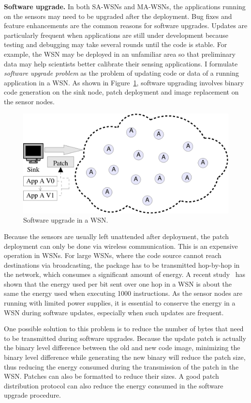 \textbf{Software upgrade.}
In both SA-WSNs and MA-WSNs, the applications running on the sensors may need to be upgraded after the deployment.
Bug fixes and feature enhancements are the common reasons for software upgrades.
Updates are particularly frequent when applications are still under development because testing and debugging may take several rounds until the code is stable.
For example, the WSN may be deployed in an unfamiliar area so that preliminary data may help scientists better calibrate their sensing applications. I formulate {\em software upgrade problem} as the problem of updating code or data of a running application in a WSN. As shown in Figure~\ref{fig:upgrade}, software upgrading involves binary code generation on the sink node, patch deployment and image replacement on the sensor nodes.
\begin{figure}[htbp]
	\centering
		\includegraphics[scale=0.45]{figures/upgrade.eps}
	\caption{Software upgrade in a WSN.}
	\label{fig:upgrade}
\end{figure}
Because the sensors are usually left unattended after deployment, the patch deployment can only be done via wireless communication.
 This is an expensive operation in WSNs. For large WSNs, where the code source cannot reach destinations via broadcasting, the package has to be transmitted hop-by-hop in the network, which consumes a significant amount of energy. A recent study~\cite{related:barr-energy} has shown that the energy used per bit sent over one hop in a WSN is about the same the energy used when executing 1000 instructions. As the sensor nodes are running with limited power supplies, it is essential to conserve the energy in a WSN during software updates, especially when such updates are frequent.
 
One possible solution to this problem is to reduce the number of bytes that need to be transmitted during software upgrades. Because the update patch is actually the binary level difference between the old and new code image, minimizing the binary level difference while generating the new binary will reduce the patch size, thus reducing the energy consumed during the transmission of the patch in the WSN. Patches can also be formatted to reduce their sizes.
A good patch distribution protocol can also reduce the energy consumed in the software upgrade procedure.


